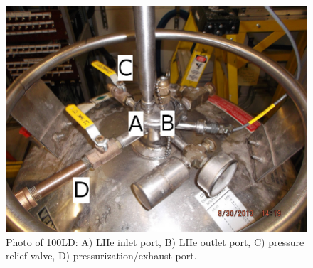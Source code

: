  \begin{figure}[!htbp]
 \centering
 \begin{minipage}{.55\textwidth}
 \includegraphics[width=\textwidth]{./img/100LD-photo.jpg}
 \caption{Photo of 100LD: A) LHe inlet port, B) LHe outlet port, C) pressure relief valve, D) pressurization/exhaust port.}
 \label{fig:100LD-photo}
 \end{minipage}
 \quad
  \begin{minipage}{.40\textwidth}

\end{minipage}
\end{figure}
